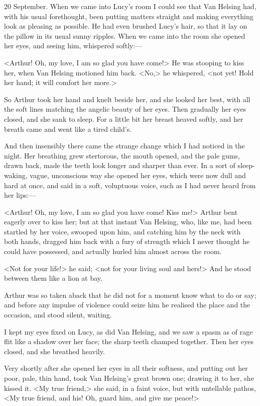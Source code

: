 \begin{diary}{20 September.}
When we came into Lucy's room I could see that Van Helsing had, with his usual forethought, been putting matters straight and making everything look as pleasing as possible. He had even brushed Lucy's hair, so that it lay on the pillow in its usual sunny ripples. When we came into the room she opened her eyes, and seeing him, whispered softly:—

<Arthur! Oh, my love, I am so glad you have come!> He was stooping to kiss her, when Van Helsing motioned him back. <No,> he whispered, <not yet! Hold her hand; it will comfort her more.>

So Arthur took her hand and knelt beside her, and she looked her best, with all the soft lines matching the angelic beauty of her eyes. Then gradually her eyes closed, and she sank to sleep. For a little bit her breast heaved softly, and her breath came and went like a tired child's.

And then insensibly there came the strange change which I had noticed in the night. Her breathing grew stertorous, the mouth opened, and the pale gums, drawn back, made the teeth look longer and sharper than ever. In a sort of sleep-waking, vague, unconscious way she opened her eyes, which were now dull and hard at once, and said in a soft, voluptuous voice, such as I had never heard from her lips:—

<Arthur! Oh, my love, I am so glad you have come! Kiss me!> Arthur bent eagerly over to kiss her; but at that instant Van Helsing, who, like me, had been startled by her voice, swooped upon him, and catching him by the neck with both hands, dragged him back with a fury of strength which I never thought he could have possessed, and actually hurled him almost across the room.

<Not for your life!> he said; <not for your living soul and hers!> And he stood between them like a lion at bay.

Arthur was so taken aback that he did not for a moment know what to do or say; and before any impulse of violence could seize him he realised the place and the occasion, and stood silent, waiting.

I kept my eyes fixed on Lucy, as did Van Helsing, and we saw a spasm as of rage flit like a shadow over her face; the sharp teeth champed together. Then her eyes closed, and she breathed heavily.

Very shortly after she opened her eyes in all their softness, and putting out her poor, pale, thin hand, took Van Helsing's great brown one; drawing it to her, she kissed it. <My true friend,> she said, in a faint voice, but with untellable pathos, <My true friend, and his! Oh, guard him, and give me peace!>


\end{diary}
